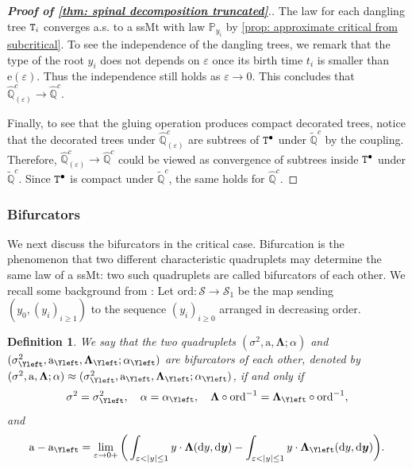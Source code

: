\documentclass[12pt]{article}
\numberwithin{equation}{section}
\theoremstyle{plain}
\newtheorem{defn}[thm]{Definition}
\theoremstyle{definition}
\newcommand{\D}{\mathrm{d}}
\newcommand{\Bd}[1]{\boldsymbol{#1}}
\newcommand{\ord}{\mathrm{ord}}
\begin{document}
\begin{proof}[\textbf{Proof of \cref{thm: spinal decomposition truncated}}.]
The law for each dangling tree ${\tt T}_i$ converges a.s. to a ssMt with law $\mathbb{P}_{y_i}$ by \cref{prop: approximate critical from subcritical}. To see the independence of the dangling trees, we remark that the type of the root $y_i$ does not depends on $\varepsilon$ once its birth time $t_i$ is smaller than $\mathrm{e}(\varepsilon)$. Thus the independence still holds as $\varepsilon\to 0$. This concludes that $\hat{\mathbb{Q}}^{c}_{(\varepsilon)} \to \hat{\mathbb{Q}}^c$.

Finally, to see that the gluing operation produces compact decorated trees, notice that the decorated trees under $\hat{\mathbb{Q}}^c_{(\varepsilon)}$ are subtrees of ${\tt T}^{\bullet}$ under $\tilde{\mathbb{Q}}^c$ by the coupling. Therefore, $\hat{\mathbb{Q}}^c_{(\varepsilon)} \to \hat{\mathbb{Q}}^c$ could be viewed as convergence of subtrees inside ${\tt T}^{\bullet}$ under $\tilde{\mathbb{Q}}^c$. Since ${\tt T}^{\bullet}$ is compact under $\tilde{\mathbb{Q}}^c$, the same holds for $\hat{\mathbb{Q}}^c$.
\end{proof}


\subsubsection{Bifurcators}\label{sec: bifurcators}

We next discuss the bifurcators in the critical case. Bifurcation is the phenomenon that two different characteristic quadruplets may determine the same law of a ssMt: two such quadruplets are called bifurcators of each other. We recall some background from \cite[Chapter 5]{BertoinJean2024SMta}: Let $\ord: \mathcal{S} \to \mathcal{S}_1$ be the map sending $(y_0, (y_i)_{i\geq 1})$  to the sequence $(y_i)_{i\geq 0}$ arranged in decreasing order.

\begin{defn}
We say that the two quadruplets $(\sigma^2, \mathrm{a}, \Bd\Lambda; \alpha)$ and $(\sigma^2_{\Yleft}, \mathrm{a}_{\Yleft}, \Bd\Lambda_{\Yleft}; \alpha_{\Yleft})$ are bifurcators of each other, denoted by $(\sigma^2, \mathrm{a}, \Bd\Lambda; \alpha)\approx(\sigma^2_{\Yleft}, \mathrm{a}_{\Yleft}, \Bd\Lambda_{\Yleft}; \alpha_{\Yleft})$, if and only if
\begin{equation}\label{eq: bifurcator condition 1}
\sigma^2 = \sigma^2_{\Yleft}, \quad \alpha = \alpha_{\Yleft},\quad \Bd\Lambda \circ \ord^{-1} = \Bd\Lambda_{\Yleft}\circ \ord^{-1},
\end{equation}
\noindent and
\begin{equation}\label{eq: bifurcator condition 2}
\mathrm{a} - \mathrm{a}_{\Yleft} = \lim_{\varepsilon\to 0+}\bigg(\int_{\varepsilon < |y|\leq 1} y\cdot\Bd\Lambda(\D y,\D \Bd y) - \int_{\varepsilon < |y|\leq 1}y\cdot \Bd\Lambda_{\Yleft}(\D y, \D\Bd y)\bigg).
\end{equation}

\end{defn}
\end{document}
